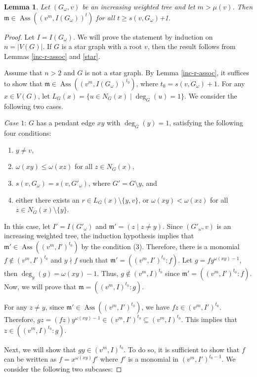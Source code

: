 \documentclass[12pt,amscd]{amsart}
\DeclareMathOperator{\ass}{Ass}
\newtheorem{lem}[thm]{Lemma}
\theoremstyle{definition}
\def\m {\mathfrak m}
\begin{document}
\begin{lem} \label{sG1} Let $(G_\omega,v)$ be an increasing weighted tree and let $m > \mu(v)$. Then  $\m\in \ass((v^m,I(G_\omega))^t)$ for all $t\geqslant s(v,G_\omega)$+1.
\end{lem}
\begin{proof}  Let $I = I(G_\omega)$. We will prove the statement by induction on $n=|V(G)|$.  If  $G$ is a star graph with a root  $v$, then  the result follows from Lemmas \ref{inc-r-assoc} and  \ref{star}.

Assume that $n>2$ and $G$ is not a star graph. By Lemma \ref{inc-r-assoc}, it suffices to show that $\m\in \ass ((v^m,I(G_\omega))^{t_0})$, where $t_0=s(v,G_\omega)+1$.
For any  $x\in V(G)$, let $L_G(x) = \{u\in N_G(x)\mid \deg_G(u)=1\}$.
We consider the following two cases.

{\it Case $1$}: $G$ has a pendant edge $xy$ with $\deg_G(y)=1$, satisfying the following four conditions:
\begin{enumerate}
    \item $y\ne v$,
    \item $\omega(xy) \leqslant \omega(xz)$ for all $z\in N_G(x)$,
    \item $s(v,G_\omega)=s(v,G'_{\omega})$, where $G'=G\setminus y$, and
    \item either  there exists an $r\in L_G(x)\setminus\{y,v\}$, or $\omega(xy) < \omega(xz)$ for all $z\in N_G(x)\setminus\{y\}$.
\end{enumerate}
In this case, let $I'=I(G'_\omega)$ and $\m' = (z\mid z\ne y)$. Since $(G'_\omega,v)$ is an increasing weighted tree, the induction hypothesis implies that $\m'\in  \ass((v^m,I')^{t_0})$ by the condition (3).
Therefore,   there is a monomial $f\notin (v^m,I')^{t_0}$ and  $y\nmid f$ such that $\m' = ((v^m,I')^{t_0}\colon f)$.
Let $g = fy^{\omega(xy)-1}$, then $\deg_y(g)=\omega(xy)-1$. Thus, $g\notin (v^m,I)^{t_0}$ since $\m' = ((v^m,I')^{t_0}\colon f)$. Now, we will prove that $\m = ((v^m,I)^{t_0}\colon g)$. 

For any $z\ne y$, since $\m'\in  \ass((v^m,I')^{t_0})$,
 we have  $fz\in (v^m,I')^{t_0}$. Therefore,  $gz = (fz)y^{\omega(xy)-1}\in (v^m,I')^{t_0}\subseteq (v^m,I)^{t_0}$. This implies that $z\in  ((v^m, I)^{t_0} : g)$.

Next, we will show that $gy \in (v^m,I)^{t_0}$.  To do so, it is sufficient to  show that $f$ can be written as  $f = x^{\omega(xy)}f'$ where $f'$ is a monomial in $(v^m,I')^{t_0-1}$. We consider the following two subcases:


\end{proof}
\end{document}
